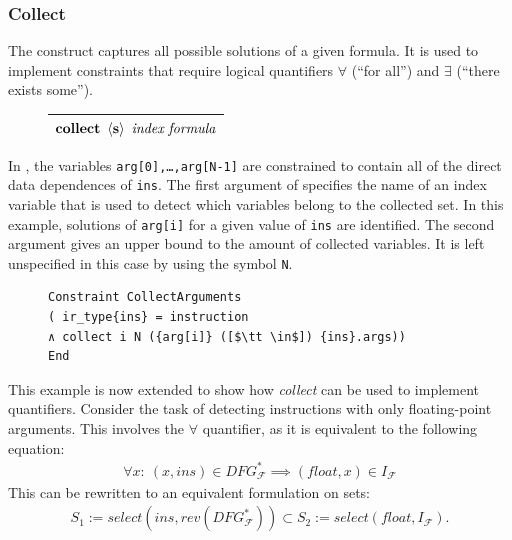 \begin{figure}[h]

\end{figure}

\subsubsection{Collect}

    The  construct captures all possible solutions of a given
    formula.
    It is used to implement constraints that require logical quantifiers
    $\forall$ (``for all'') and $\exists$ (``there exists some'').
\begin{figure}[H]
    \centering
    \begin{tabular}{|c|}
        \hline
        $\text{\bf collect}\ \left<\text{\bf s}\right>\ \text{\it index}\ \text{\it formula}$\\
        \hline
    \end{tabular}
\end{figure}

    \noindent
    In , the variables \texttt{arg[0],\dots,arg[N-1]}
    are constrained to contain all of the direct data dependences of
    \texttt{ins}.
    The first argument of  specifies the name of an index
    variable that is used to detect which variables belong to the collected set.
    In this example, solutions of \texttt{arg[i]} for a given value
    of \texttt{ins} are identified.
    The second argument gives an upper bound to the amount of collected
    variables.
    It is left unspecified in this case by using the symbol \texttt{N}.

\begin{figure}[t]
\begin{lstlisting}[language=CAnDL,label={fig:simplecollect},caption=
   {Simple {\it collect} example in CAnDL: All direct data dependences of
    {\tt ins} are collected.\leftskip=0pt\rightskip=0pt}]
Constraint CollectArguments
( ir_type{ins} = instruction
∧ collect i N ({arg[i]} ([$\tt \in$]) {ins}.args))
End
\end{lstlisting}
\end{figure}

    This example is now extended to show how {\it collect} can be used to
    implement quantifiers.
    Consider the task of detecting instructions with only floating-point
    arguments.
    This involves the $\forall$ quantifier, as it is equivalent to
    the following equation:
    \begin{align}
        \forall x\colon\ (x,ins)\in DFG_\mathcal F^*\implies(float,x)\in I_\mathcal F
        \label{fig:implication}
    \end{align}
    This can be rewritten to an equivalent formulation on sets:
    \begin{align*}
        S_1:= select(ins,rev(DFG_\mathcal F^*))\subset S_2:=select(float,I_\mathcal F).
    \end{align*}

